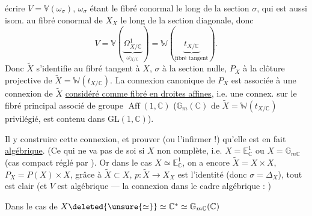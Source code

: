 écrire $V=\mathbb V(\omega_\sigma)$, $\omega_\sigma$ étant le fibré conormal le long de la section $\sigma$, qui est aussi isom. au fibré conormal de $X_X$ le long de la section diagonale, donc
\[
V=\mathbb V(\underbrace{\Omega^1_{X/\mathbb C}}_{\omega_{X/\mathbb C}})=\mathbb W(\underbrace{t_{X/\mathbb C}}_{\text{fibré tangent}}).
\]
Donc $\widetilde X$ s'identifie au fibré tangent à $X$, $\sigma$ à la section nulle, $P_X$ à la clôture projective de $\widetilde X=\mathbb W(t_{X/\mathbb C})$. La connexion  canonique de $P_X$ est associée à une connexion de $\widetilde X$ \uline{considéré comme fibré en droites affines}, i.e. une connex. sur le fibré principal associé de groupe $\operatorname{Aff}(1,\mathbb C)$ ($\mathbb G_m(\mathbb C)$ de $\widetilde X=\mathbb W(t_{X/\mathbb C})$ privilégié, est contenu dans $\mathrm{GL}(1,\mathbb C)$).

Il y  construire cette connexion, et prouver (ou l'infirmer !) qu'elle est en fait \uline{algébrique}. (Ce qui ne va pas de soi si $X$ non complète, i.e. $X=\mathbb E^1_{\mathbb C}$ ou $X=\mathbb G_{m\mathbb C}$ (cas compact réglé par ). Or dans le cas $X\simeq \mathbb E^1_{\mathbb C}$, on a encore $\widetilde X=X\times X$, $P_X=P(X)\times X$, grâce à $\widetilde X\subset X$, $p:\widetilde X\longrightarrow X_X$ est l'identité (donc $\sigma=\Delta_X$), tout est clair (et $V$ est algébrique --- la connexion dans le cadre algébrique : )

Dans le cas de $X\deleted{\unsure{\simeq}}\simeq\mathbb C^*\simeq\mathbb G_{m\mathbb C}(\mathbb C)$
